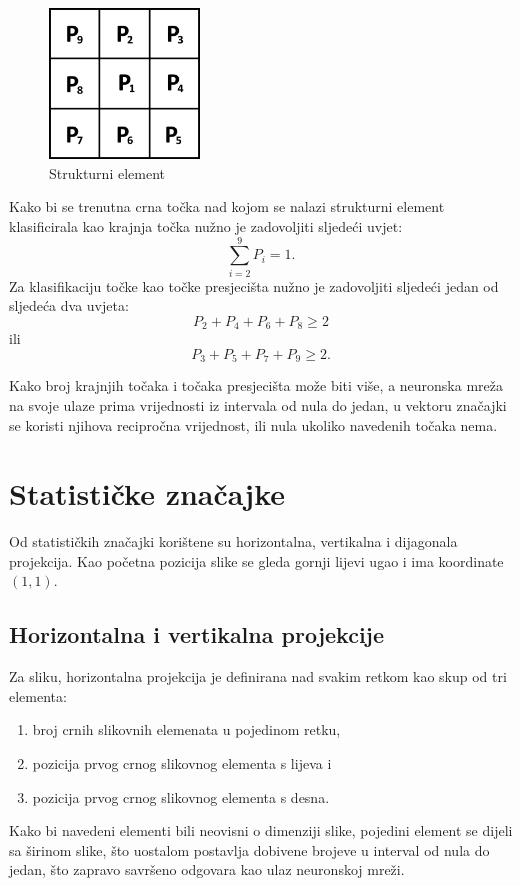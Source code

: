 \begin{figure}[htb]
    \centering
    \includegraphics[width=4cm]{images/kernel.jpg}
    \caption{Strukturni element}
    \label{fig:points_kernel}
\end{figure}

Kako bi se trenutna crna točka nad kojom se nalazi strukturni element klasificirala kao krajnja točka nužno je zadovoljiti sljedeći uvjet:$$\sum_{i=2}^{9} P_i = 1.$$
Za klasifikaciju točke kao točke presjecišta nužno je zadovoljiti sljedeći jedan od sljedeća dva uvjeta:$$P_2 + P_4 + P_6 + P_8 \geq 2$$ ili $$P_3 + P_5 + P_7 + P_9 \geq 2.$$

Kako broj krajnjih točaka i točaka presjecišta može biti više, a neuronska mreža na svoje ulaze prima vrijednosti iz intervala od nula do jedan, u vektoru značajki se koristi njihova recipročna vrijednost, ili nula ukoliko navedenih točaka nema.

\section{Statističke značajke}

Od statističkih značajki korištene su horizontalna, vertikalna i dijagonala projekcija. Kao početna pozicija slike se gleda gornji lijevi ugao i ima koordinate $(1, 1)$.

\subsection{Horizontalna i vertikalna projekcije}

Za sliku, horizontalna projekcija je definirana nad svakim retkom kao skup od tri elementa:
\begin{enumerate}
    \item broj crnih slikovnih elemenata u pojedinom retku,
    \item pozicija prvog crnog slikovnog elementa s lijeva i
    \item pozicija prvog crnog slikovnog elementa s desna.
\end{enumerate}
Kako bi navedeni elementi bili neovisni o dimenziji slike, pojedini element se dijeli sa širinom slike, što uostalom postavlja dobivene brojeve u interval od nula do jedan, što zapravo savršeno odgovara kao ulaz neuronskoj mreži.

